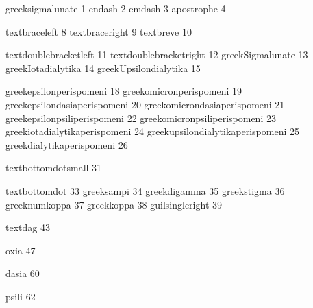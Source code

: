 
\startencoding[agr]

 greeksigmalunate                    1
 endash                              2
 emdash                              3
 apostrophe                          4

 textbraceleft                       8
 textbraceright                      9
 textbreve                          10

 textdoublebracketleft              11
 textdoublebracketright             12
 greekSigmalunate                   13
 greekIotadialytika                 14
 greekUpsilondialytika              15

 greekepsilonperispomeni            18
 greekomicronperispomeni            19
 greekepsilondasiaperispomeni       20
 greekomicrondasiaperispomeni       21
 greekepsilonpsiliperispomeni       22
 greekomicronpsiliperispomeni       23
 greekiotadialytikaperispomeni      24
 greekupsilondialytikaperispomeni   25
 greekdialytikaperispomeni          26

 textbottomdotsmall                 31

 textbottomdot                      33
 greeksampi                         34
 greekdigamma                       35
 greekstigma                        36
 greeknumkoppa                      37
 greekkoppa                         38
 guilsingleright                    39

 textdag                            43

 oxia                               47

 dasia                              60

 psili                              62


